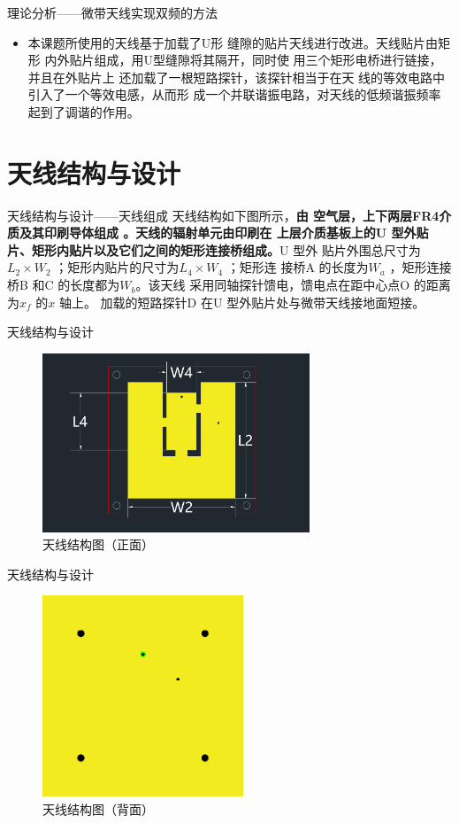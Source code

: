 \documentclass[10pt]{beamer}
\begin{document}
\begin{frame}{理论分析——{\normalsize 微带天线实现双频的方法}}
	\begin{itemize}
		\item 本课题所使用的天线基于加载了U形
		缝隙的贴片天线进行改进。天线贴片由矩形
		内外贴片组成，用U型缝隙将其隔开，同时使
		用三个矩形电桥进行链接，并且在外贴片上
		还加载了一根短路探针，该探针相当于在天
		线的等效电路中引入了一个等效电感，从而形
		成一个并联谐振电路，对天线的低频谐振频率
		起到了调谐的作用。
	\end{itemize}
\end{frame}

\section{天线结构与设计}
\begin{frame}{天线结构与设计——{\normalsize 天线组成}}
	\qquad 天线结构如下图所示，{\large  \bfseries 由
	{空气层}，上下两层FR4介质及其印刷导体组成
	。天线的辐射单元由印刷在
	上层介质基板上的U
型外贴片、矩形内贴片以及它们之间的矩形连接桥组成。}U 型外
贴片外围总尺寸为$L_2 \times W_2$
；矩形内贴片的尺寸为$L_4 \times W_4$
；矩形连
接桥A 的长度为$W_a$
，矩形连接桥B 和C 的长度都为$W_b$。该天线
采用同轴探针馈电，馈电点在距中心点O 的距离为$x_f$
的$x$ 轴上。
加载的短路探针D 在U 型外贴片处与微带天线接地面短接。
\end{frame}
\begin{frame}{天线结构与设计}
	\begin{figure}[htbp]
		\centering
		\includegraphics[width=8cm]{figs/f3.png}
		\caption{天线结构图（正面）}
	\end{figure}
\end{frame}
\begin{frame}{天线结构与设计}
	\begin{figure}[htbp]
		\centering
		\includegraphics[width=6cm]{figs/f4.png}
		\caption{天线结构图（背面）}
	\end{figure}
\end{frame}
\end{document}
